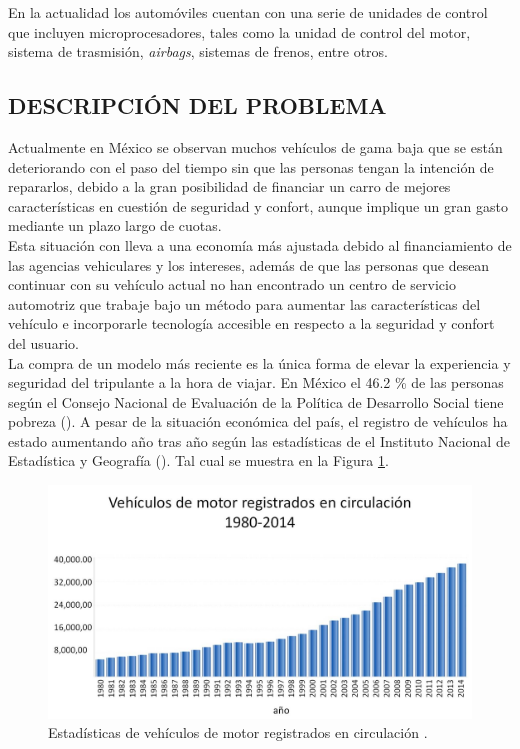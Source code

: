 En la actualidad los automóviles cuentan con una serie de unidades de control que incluyen microprocesadores, tales como la unidad de control del motor, sistema de trasmisión, \textit{airbags}, sistemas de frenos, entre otros.\\


\subsection{DESCRIPCIÓN DEL PROBLEMA}

Actualmente en México se observan muchos vehículos de gama baja que se están deteriorando con el paso del tiempo sin que las personas tengan la intención de repararlos, debido a la gran posibilidad de financiar un carro de mejores características en cuestión de seguridad y confort, aunque implique un gran gasto mediante un plazo largo de cuotas.\\

Esta situación con lleva a una economía más ajustada debido al financiamiento de las agencias vehiculares y los intereses, además de que las personas que desean continuar con su vehículo actual no han encontrado un centro de servicio automotriz que trabaje bajo un método para aumentar las características del vehículo e incorporarle tecnología accesible en respecto a la seguridad y confort del usuario.\\

La compra de un modelo más reciente es la única forma de elevar la experiencia y seguridad del tripulante a la hora de viajar. En México el 46.2 \% de las personas según el Consejo Nacional de Evaluación de la Política de Desarrollo Social tiene pobreza (\cite{UPS-18}). A pesar de la situación económica del país, el registro de vehículos ha estado aumentando año tras año según las estadísticas de el Instituto Nacional de Estadística y Geografía (\cite{UPS-17}). Tal cual se muestra en la Figura \ref{Fcero2}. \\

\begin{figure}[H]
\centering
\includegraphics[width=1\textwidth]{introduccion/fig15.jpg}
\caption{Estadísticas de vehículos de motor registrados en circulación \cite{UPS-17}. }
\label{Fcero2}
\end{figure}



